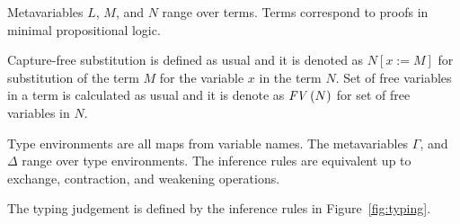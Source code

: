 \documentclass[a4paper]{article}
\newcommand{\sbs}[3]{#1[#2:=#3]}
\newcommand{\fv}[1]{\txt{FV}\,(#1)}
\newcommand{\txt}[1]{\text{\textit{#1}}}
\begin{document}
Metavariables $L$, $M$, and $N$ range over terms. Terms
correspond to proofs in minimal propositional logic.


Capture-free substitution is defined as usual and it is denoted as
$\sbs{N}{x}{M}$ for substitution of the term $M$ for the variable
$x$ in the term $N$. Set of free variables in a term is
calculated as usual and it is denote as $\fv{N}$ for set of free
variables in $N$.

Type %
 environments are all maps from
variable names. The metavariables $\Gamma$, and $\Delta$ range over
type environments.  The inference rules are equivalent up to exchange,
contraction, and weakening operations.

The typing judgement is defined by the inference rules in
Figure~\ref{fig:typing}.
\end{document}
